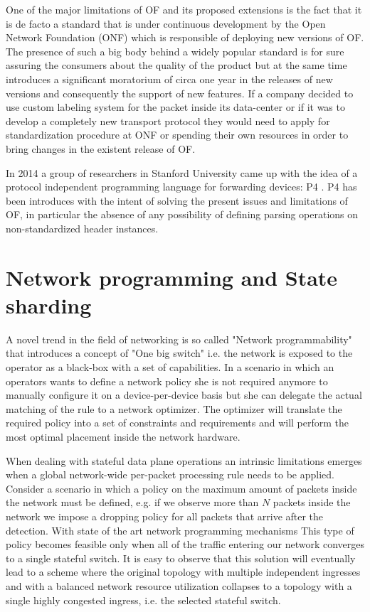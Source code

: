 One of the major limitations of OF and its proposed extensions is the fact that it is de facto a standard that is under continuous development by the Open Network Foundation (ONF) which is responsible of deploying new versions of OF. The presence of such a big body behind a widely popular standard is for sure assuring the consumers about the quality of the product but at the same time introduces a significant moratorium of circa one year in the releases of new versions and consequently the support of new features. If a company decided to use custom labeling system for the packet inside its data-center or if it was to develop a completely new transport protocol they would need to apply for standardization procedure at ONF or spending their own resources in order to bring changes in the existent release of OF. 

In 2014 a group of researchers in Stanford University came up with the idea of a protocol independent programming language for forwarding devices: P4 \cite{bosshart2014p4}. P4 has been introduces with the intent of solving the present issues and limitations of OF, in particular the absence of any possibility of defining parsing operations on non-standardized header instances.

\section{Network programming and State sharding}
A novel trend in the field of networking is so called "Network programmability" that introduces a concept of "One big switch" i.e. the network is exposed to the operator as a black-box with a set of capabilities. In a scenario in which an operators wants to define a network policy she is not required anymore to manually configure it on a device-per-device basis but she can delegate the actual matching of the rule to a network optimizer. The optimizer will translate the required policy into a set of constraints and requirements and will perform the most optimal placement inside the network hardware.

When dealing with stateful data plane operations an intrinsic limitations emerges when a global network-wide per-packet processing rule needs to be applied. Consider a scenario in which a policy on the maximum amount of packets inside the network must be defined, e.g. if we observe more than $N$ packets inside the network we impose a dropping policy for all packets that arrive after the detection. With state of the art network programming mechanisms  This type of policy becomes feasible only when all of the traffic entering our network converges to a single stateful switch. It is easy to observe that this solution will eventually lead to a scheme where the original topology with multiple independent ingresses and with a balanced network resource utilization collapses to a topology with a single highly congested ingress, i.e. the selected stateful switch.

